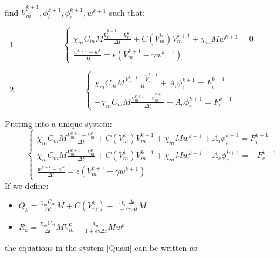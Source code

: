 \documentclass[a4paper,11pt]{article}
\begin{document}
\begin{center} find $\tilde{V}_m^{k+1}, \phi_i^{k+1}, \phi_e^{k+1},w^{k+1}$ such that: \end{center}
\begin{enumerate}[label = \Roman*]
\item
\begin{equation*}
\begin{cases}
\chi_m C_m M \frac{\tilde{V}_m^{k+1}-V_m^k}{\Delta t} +  C(V_m^k) V_m^{k+1} + \chi_m M w^{k+1}= 0\\
\frac{w^{k+1} - w^k}{\Delta t} = \epsilon (V_m^{k+1}-\gamma w^{k+1})
\end{cases}
\end{equation*}
\item
\begin{equation*}
\begin{cases}
\chi_m C_m M \frac{V_m^{k+1}-\tilde{V}_m^{k+1}}{\Delta t} + A_i \phi_i^{k+1}= F_i^{k+1}\\
- \chi_m C_m M \frac{V_m^{k+1}-\tilde{V}_m^{k+1}}{\Delta t} + A_e \phi_e^{k+1}= F_e^{k+1}
\end{cases}
\end{equation*}
\end{enumerate}
\vspace{3mm}
Putting into a unique system:
\begin{equation}\label{Quasi}
\begin{cases}
\chi_m C_m M \frac{V_m^{k+1}-V_m^{k}}{\Delta t} + C(V_m^k) V_m^{k+1} + \chi_m M w^{k+1} + A_i \phi_i ^{k+1} = F_i^{k+1} \\
\chi_m C_m M \frac{V_m^{k+1}-V_m^{k}}{\Delta t} +  C(V_m^k) V_m^{k+1} + \chi_m M w^{k+1} - A_e \phi_e ^{k+1} =  -F_e^{k+1} \\
\frac{w^{k+1}-w^{k}}{\Delta t} = \epsilon(V_m^{k+1}-\gamma w^{k+1})
\end{cases}
\end{equation}
If we define:
\begin{itemize}
\item $Q_k = \frac{\chi_m C_m}{\Delta t}M + C(V_m^k) + \frac{\epsilon\chi_m \Delta t}{1 + \epsilon \gamma \Delta t} M$ 
\item $R_k = \frac{\chi_mC_m}{\Delta t}MV_m^k - \frac{\chi_m}{1+\epsilon\gamma\Delta t}M w^k$
\end{itemize}
\vspace{4mm}
the equations in the system \ref{Quasi} can be written as:
\end{document}
